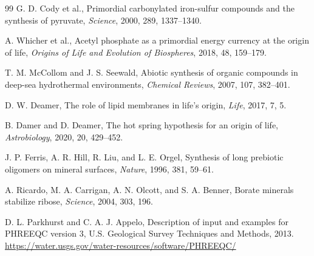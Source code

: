 \documentclass[11pt]{article}
\begin{document}
\begin{thebibliography}{99}
G. D. Cody et al.,
Primordial carbonylated iron-sulfur compounds and the synthesis of pyruvate,
\emph{Science}, 2000, 289, 1337--1340.

A. Whicher et al.,
Acetyl phosphate as a primordial energy currency at the origin of life,
\emph{Origins of Life and Evolution of Biospheres}, 2018, 48, 159--179.

T. M. McCollom and J. S. Seewald,
Abiotic synthesis of organic compounds in deep-sea hydrothermal environments,
\emph{Chemical Reviews}, 2007, 107, 382--401.

D. W. Deamer,
The role of lipid membranes in life's origin,
\emph{Life}, 2017, 7, 5.

B. Damer and D. Deamer,
The hot spring hypothesis for an origin of life,
\emph{Astrobiology}, 2020, 20, 429--452.

J. P. Ferris, A. R. Hill, R. Liu, and L. E. Orgel,
Synthesis of long prebiotic oligomers on mineral surfaces,
\emph{Nature}, 1996, 381, 59--61.

A. Ricardo, M. A. Carrigan, A. N. Olcott, and S. A. Benner,
Borate minerals stabilize ribose,
\emph{Science}, 2004, 303, 196.

D. L. Parkhurst and C. A. J. Appelo,
Description of input and examples for PHREEQC version 3,
U.S. Geological Survey Techniques and Methods, 2013.
\url{https://water.usgs.gov/water-resources/software/PHREEQC/}

\end{thebibliography}
\end{document}
